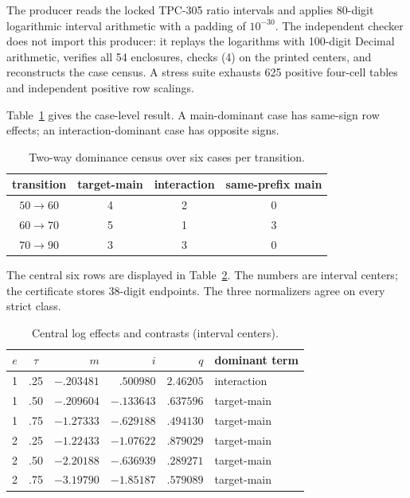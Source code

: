 \documentclass[11pt]{article}
\begin{document}
The producer reads the locked TPC-305 ratio intervals and applies 80-digit
logarithmic interval arithmetic with a padding of $10^{-30}$.  The independent
checker does not import this producer: it replays the logarithms with
100-digit Decimal arithmetic, verifies all 54 enclosures, checks (4) on the
printed centers, and reconstructs the case census.  A stress suite exhausts
625 positive four-cell tables and independent positive row scalings.

Table~\ref{tab:pair} gives the case-level result.  A main-dominant case has
same-sign row effects; an interaction-dominant case has opposite signs.

\begin{table}[t]
\centering\small
\caption{Two-way dominance census over six cases per transition.}
\label{tab:pair}
\begin{tabular}{c c c c}
\toprule
transition & target-main & interaction & same-prefix main\\
\midrule
$50\to60$ & 4 & 2 & 0\\
$60\to70$ & 5 & 1 & 3\\
$70\to90$ & 3 & 3 & 0\\
\bottomrule
\end{tabular}
\end{table}

The central six rows are displayed in Table~\ref{tab:central}.  The numbers
are interval centers; the certificate stores 38-digit endpoints.  The three
normalizers agree on every strict class.

\begin{table}[t]
\centering\small
\caption{Central log effects and contrasts (interval centers).}
\label{tab:central}
\begin{tabular}{c c r r r l}
\toprule
$e$ & $\tau$ & $m$ & $i$ & $q$ & dominant term\\
\midrule
1 & .25 & $-.203481$ & $.500980$ & $2.46205$ & interaction\\
1 & .50 & $-.209604$ & $-.133643$ & $.637596$ & target-main\\
1 & .75 & $-1.27333$ & $-.629188$ & $.494130$ & target-main\\
2 & .25 & $-1.22433$ & $-1.07622$ & $.879029$ & target-main\\
2 & .50 & $-2.20188$ & $-.636939$ & $.289271$ & target-main\\
2 & .75 & $-3.19790$ & $-1.85187$ & $.579089$ & target-main\\
\bottomrule
\end{tabular}
\end{table}
\end{document}

